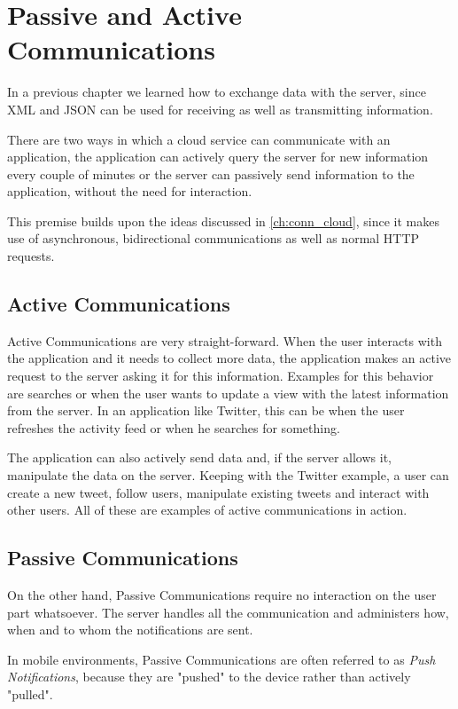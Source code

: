 \chapter{Passive and Active Communications}\label{ch:passive_com}

In a previous chapter we learned how to exchange data with the server, since \ac{XML} and \ac{JSON} can be used for receiving as well as transmitting information.

There are two ways in which a cloud service can communicate with an application, the application can actively query the server for new information every couple of minutes or the server can passively send information to the application, without the need for interaction.

This premise builds upon the ideas discussed in \autoref{ch:conn_cloud}, since it makes use of asynchronous, bidirectional communications as well as normal HTTP requests.

\section{Active Communications}
Active Communications are very straight-forward. When the user interacts with the application and it needs to collect more data, the application makes an active request to the server asking it for this information. Examples for this behavior are searches or when the user wants to update a view with the latest information from the server. In an application like Twitter, this can be when the user refreshes the activity feed or when he searches for something.

The application can also actively send data and, if the server allows it, manipulate the data on the server. Keeping with the Twitter example, a user can create a new tweet, follow users, manipulate existing tweets and interact with other users. All of these are examples of active communications in action.

\section{Passive Communications}
On the other hand, Passive Communications require no interaction on the user part whatsoever. The server handles all the communication and administers how, when and to whom the notifications are sent.

In mobile environments, Passive Communications are often referred to as \textit{Push Notifications}, because they are "pushed" to the device rather than actively "pulled".

